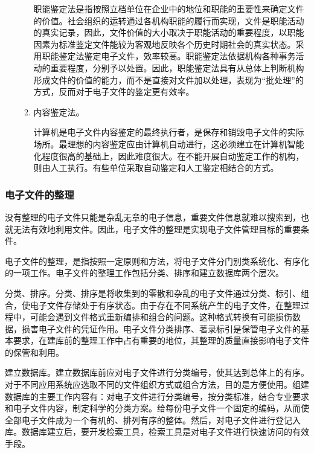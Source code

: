 \begin{itemize}
\begin{enumerate}
            职能鉴定法是指按照立档单位在企业中的地位和职能的重要性来确定文件的价值。社会组织的运转通过各机构职能的履行而实现，文件是职能活动的真实记录，因此，文件价值的大小取决于职能活动的重要程度，以职能因素为标准鉴定文件能较为客观地反映各个历史时期社会的真实状态。采用职能鉴定法鉴定电子文件，效率较高。职能鉴定法依据机构各种事务活动的重要程度，分别予以处置。因此，职能鉴定法具有从总体上判断机构形成文件的价值的能力，而不是直接对文件加以处理，表现为“批处理”的方式，反而对于电子文件的鉴定更有效率。
            \item  内容鉴定法。

            计算机是电子文件内容鉴定的最终执行者，是保存和销毁电子文件的实际场所。最理想的内容鉴定应由计算机自动进行，这必须建立在计算机智能化程度很高的基础上，因此难度很大。在不能开展自动鉴定工作的机构，则由人工执行。有些单位采取自动鉴定和人工鉴定相结合的方式。
        \end{enumerate}
    \end{itemize}

    \subsubsection {电子文件的整理}

    没有整理的电子文件只能是杂乱无章的电子信息，重要文件信息就难以搜索到，也就无法有效地利用文件。因此，电子文件的整理是实现电子文件管理目标的重要条件。

    电子文件的整理，是指按照一定原则和方法，将电子文件分门别类系统化、有序化的一项工作。电子文件的整理工作包括分类、排序和建立数据库两个层次。

    \begin{enumerate.zh}
        \item 分类、排序。分类、排序是将收集到的零散和杂乱的电子文件通过分类、标引、组合，使电子文件存储处于有序状态。由于存在不同系统产生的电子文件，在整理过程中，可能会遇到文件格式重新编排和组合的问题。这种格式转换有可能损伤数据，损害电子文件的凭证作用。电子文件分类排序、著录标引是保管电子文件的基本要求，在建库前的整理工作中占有重要的地位，其整理的质量直接影响电子文件的保管和利用。

        \item 建立数据库。建立数据库前应对电子文件进行分类编号，使其达到总体上的有序。对于不同应用系统应选取不同的文件组织方式或组合方法，目的是方便使用。组建数据库的主要工作内容有：对电子文件进行分类编号，按分类标准，结合专业要求和电子文件内容，制定科学的分类方案。给每份电子文件一个固定的编码，从而使全部电子文件成为一个有机的、排列有序的整体。然后，对电子文件进行登记入库。数据库建立后，要开发检索工具，检索工具是对电子文件进行快速访问的有效手段。
    \end{enumerate.zh}


